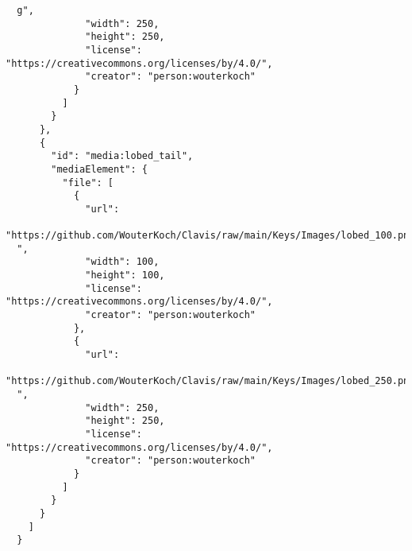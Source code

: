 \documentclass[10pt,letterpaper]{article}
\begin{document}
\begin{verbatim}
  g",
              "width": 250,
              "height": 250,
              "license": "https://creativecommons.org/licenses/by/4.0/",
              "creator": "person:wouterkoch"
            }
          ]
        }
      },
      {
        "id": "media:lobed_tail",
        "mediaElement": {
          "file": [
            {
              "url":
  "https://github.com/WouterKoch/Clavis/raw/main/Keys/Images/lobed_100.png
  ",
              "width": 100,
              "height": 100,
              "license": "https://creativecommons.org/licenses/by/4.0/",
              "creator": "person:wouterkoch"
            },
            {
              "url":
  "https://github.com/WouterKoch/Clavis/raw/main/Keys/Images/lobed_250.png
  ",
              "width": 250,
              "height": 250,
              "license": "https://creativecommons.org/licenses/by/4.0/",
              "creator": "person:wouterkoch"
            }
          ]
        }
      }
    ]
  }

\end{verbatim}
\nolinenumbers
\end{document}
